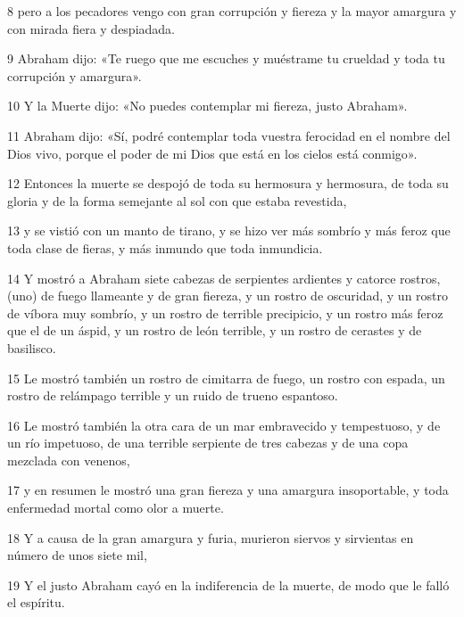 \par 8 pero a los pecadores vengo con gran corrupción y fiereza y la mayor amargura y con mirada fiera y despiadada.

\par 9 Abraham dijo: «Te ruego que me escuches y muéstrame tu crueldad y toda tu corrupción y amargura».

\par 10 Y la Muerte dijo: «No puedes contemplar mi fiereza, justo Abraham».

\par 11 Abraham dijo: «Sí, podré contemplar toda vuestra ferocidad en el nombre del Dios vivo, porque el poder de mi Dios que está en los cielos está conmigo».

\par 12 Entonces la muerte se despojó de toda su hermosura y hermosura, de toda su gloria y de la forma semejante al sol con que estaba revestida,

\par 13 y se vistió con un manto de tirano, y se hizo ver más sombrío y más feroz que toda clase de fieras, y más inmundo que toda inmundicia.

\par 14 Y mostró a Abraham siete cabezas de serpientes ardientes y catorce rostros, (uno) de fuego llameante y de gran fiereza, y un rostro de oscuridad, y un rostro de víbora muy sombrío, y un rostro de terrible precipicio, y un rostro más feroz que el de un áspid, y un rostro de león terrible, y un rostro de cerastes y de basilisco.

\par 15 Le mostró también un rostro de cimitarra de fuego, un rostro con espada, un rostro de relámpago terrible y un ruido de trueno espantoso.

\par 16 Le mostró también la otra cara de un mar embravecido y tempestuoso, y de un río impetuoso, de una terrible serpiente de tres cabezas y de una copa mezclada con venenos,

\par 17 y en resumen le mostró una gran fiereza y una amargura insoportable, y toda enfermedad mortal como olor a muerte.

\par 18 Y a causa de la gran amargura y furia, murieron siervos y sirvientas en número de unos siete mil,

\par 19 Y el justo Abraham cayó en la indiferencia de la muerte, de modo que le falló el espíritu.

